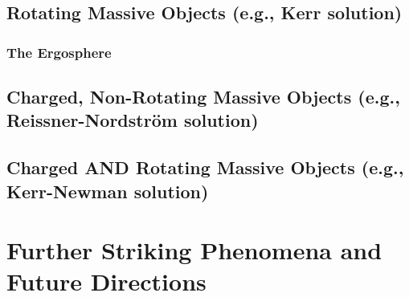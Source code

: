 \documentclass{amsart}
\theoremstyle{definition}
\theoremstyle{remark}
\begin{document}
\subsection{Rotating Massive Objects (e.g., Kerr solution)}
\subsubsection{The Ergosphere}

\subsection{Charged, Non-Rotating Massive Objects (e.g., Reissner-Nordström solution)}

\subsection{Charged AND Rotating Massive Objects (e.g., Kerr-Newman solution)}

\section{Further Striking Phenomena and Future Directions}
\label{sec:future_phenomena}
\end{document}
